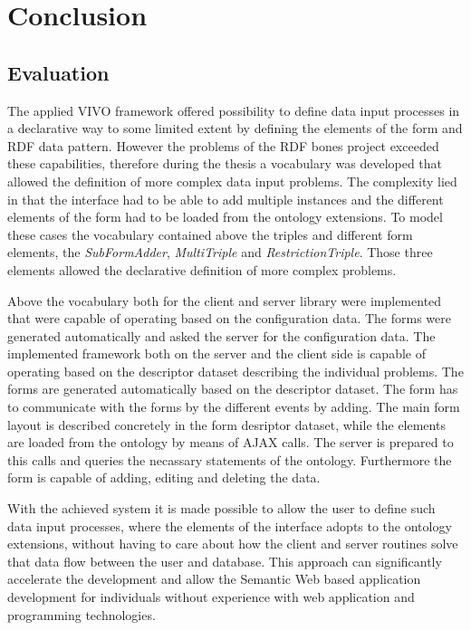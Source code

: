 

\chapter{Conclusion}

\section{Evaluation}

The applied VIVO framework offered possibility to define data input processes in a declarative way to some limited extent by defining the elements of the form and RDF data pattern. However the problems of the RDF bones project exceeded these capabilities, therefore during the thesis a vocabulary was developed that allowed the definition of more complex data input problems. The complexity lied in that the interface had to be able to add multiple instances and the different elements of the form had to be loaded from the ontology extensions. To model these cases the vocabulary contained above the triples and different form elements, the \textit{SubFormAdder}, \textit{MultiTriple} and \textit{RestrictionTriple}. Those three elements allowed the declarative definition of more complex problems. 


Above the vocabulary both for the client and server library were implemented that were capable of operating based on the configuration data. The forms were generated automatically and asked the server for the configuration data.
The implemented framework both on the server and the client side is capable of operating based on the descriptor dataset describing the individual problems. The forms are generated automatically based on the descriptor dataset. The form has to communicate with the forms by the different events by adding. 
The main form layout is described concretely in the form desriptor dataset, while the elements are loaded from the ontology by means of AJAX calls. The server is prepared to this calls and queries the necassary statements of the ontology. Furthermore the form is capable of adding, editing and deleting the data. 


With the achieved system it is made possible to allow the user to define such data input processes, where the elements of the interface adopts to the ontology extensions, without having to care about how the client and server routines solve that data flow between the user and database. This approach can significantly accelerate the development and allow the Semantic Web based application development for individuals without experience with web application and programming technologies.








